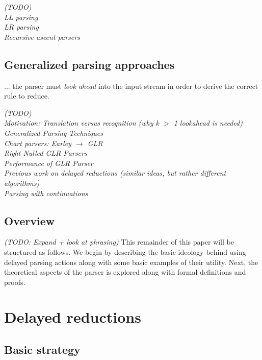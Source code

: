 \documentclass[11pt]{article}
\begin{document}
\emph{(TODO)\\ %
LL parsing\\
LR parsing \cite{knuth65}\\
Recursive ascent parsers \cite{13326, 47909, 770849} }

\subsection{Generalized parsing approaches}

... the parser must \emph{look ahead} into the input stream in order to derive the correct rule to reduce.

\emph{(TODO)\\ %
Motivation: Translation versus recognition (why k $>$ 1 lookahead is needed) \cite{Parr95lland}\\
Generalized Parsing Techniques \cite{Thurston07}\\
Chart parsers: Earley $\rightarrow$ GLR \\
Right Nulled GLR Parsers \cite{1146810}\\
Performance of GLR Parser \cite{Mcpeak04elkhound:a}\\ %
Previous work on delayed reductions (similar ideas, but rather different algorithms) \cite{1287949, Marc80, 991520, 146993}\\
Parsing with continuations
}


\subsection{Overview}
\emph{(TODO: Expand + look at phrasing)}
This remainder of this paper will be structured as follows. 
We begin by describing the basic ideology behind using delayed parsing actions along with some basic examples of their utility.
Next, the theoretical aspects of the parser is explored along with formal definitions and proofs.





\section{Delayed reductions}

\subsection{Basic strategy}
\end{document}
